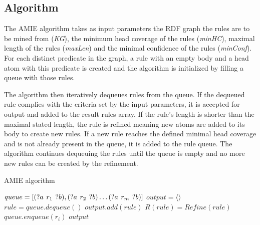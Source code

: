 \subsection{Algorithm}

The AMIE algorithm takes as input parameters the RDF graph the rules are to be mined from (\textit{KG}), the minimum head coverage of the rules (\textit{minHC}), maximal length of the rules (\textit{maxLen}) and the minimal confidence of the rules (\textit{minConf}). For each distinct predicate in the graph, a rule with an empty body and a head atom with this predicate is created and the algorithm is initialized by filling a queue with those rules. 

The algorithm then iteratively dequeues rules from the queue. If the dequeued rule complies with the criteria set by the input parameters, it is accepted for output and added to the result rules array. If the rule's length is shorter than the maximal stated length, the rule is refined meaning new atoms are added to its body to create new rules. If a new rule reaches the defined minimal head coverage and is not already present in the queue, it is added to the rule queue. The algorithm continues dequeuing the rules until the queue is empty and no more new rules can be created by the refinement.

\begin{algorithm}
\caption{AMIE algorithm}
\scriptsize
\begin{algorithmic}[1]
\State $queue = [(?a\hspace{0.4em}r_{1}\hspace{0.4em}?b), (?a\hspace{0.4em}r_{2}\hspace{0.4em}?b) \ldots (?a\hspace{0.4em}r_{m}\hspace{0.4em}?b)]$
\State $output = \langle \rangle$
\State $rule = queue.dequeue()$
\State $output.add(rule)$
\EndIf
{}
\State $R(rule) = Refine(rule)$
\EndIf
{}
\State $queue.enqueue(r_{i})$
\EndIf
\EndFor
\EndWhile
\State \Return $output$
\EndProcedure
\end{algorithmic}
\end{algorithm}

